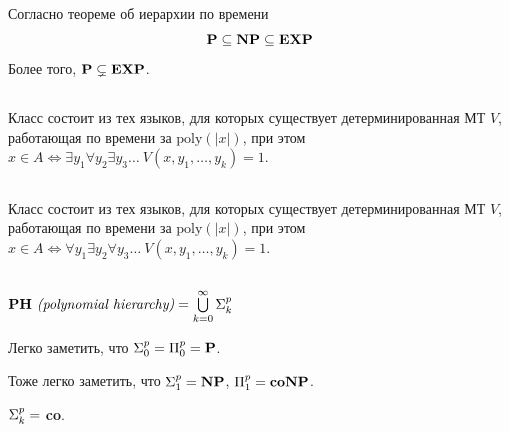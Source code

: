 \begin{note} Согласно теореме об иерархии по времени
\begin{equation*}
    \textbf{P} \subseteq \textbf{NP} \subseteq \textbf{EXP}
\end{equation*}
Более того, $\textbf{P} \subsetneq \textbf{EXP}$.
\end{note}

\subsection{}

\begin{definition}
Класс  состоит из тех языков, для которых существует детерминированная МТ $V$, работающая по времени за $\text{poly}(|x|)$, при этом $x \in A \Longleftrightarrow \exists y_1 \forall y_2 \exists y_3 \ldots \ V(x, y_1, \ldots, y_k) = 1$.
\end{definition}

\subsection{}

\begin{definition}
Класс  состоит из тех языков, для которых существует детерминированная МТ $V$, работающая по времени за $\text{poly}(|x|)$, при этом $x \in A \Longleftrightarrow \forall y_1 \exists y_2 \forall y_3 \ldots \ V(x, y_1, \ldots, y_k) = 1$.
\end{definition}

\subsection{\ph}

\begin{definition}
$\textbf{PH} \textit{ (polynomial hierarchy)} = \bigcup\limits_{k = 0}^\infty \textbf{$\Sigma_{k}^p$}$
\end{definition}

\begin{note}
Легко заметить, что $\textbf{$\Sigma_{0}^p$} = \textbf{$\Pi_{0}^p$} = \textbf{P}$.
\end{note}

\begin{note}
Тоже легко заметить, что $\textbf{$\Sigma_{1}^p$} = \textbf{NP}$, $\textbf{$\Pi_{1}^p$} = \textbf{coNP}$.
\end{note}

\begin{statement}
$\textbf{$\Sigma_{k}^p$} =$ \textbf{co}.
\end{statement}

